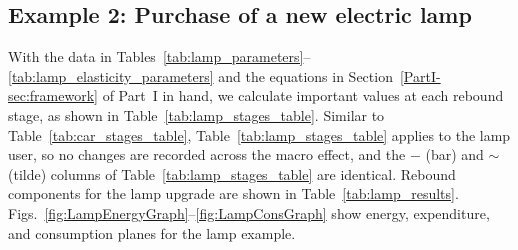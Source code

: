 \documentclass[12pt]{article}\usepackage[]{graphicx}\usepackage[]{xcolor}
\begin{document}
\subsection{Example 2: Purchase of a new electric lamp}
\label{sec:lamp_example}

With the data in
Tables~\ref{tab:lamp_parameters}--\ref{tab:lamp_elasticity_parameters}
and the equations in Section~\ref{PartI-sec:framework} of Part~I in hand,
we calculate important values at each rebound stage,
as shown in Table~\ref{tab:lamp_stages_table}.
Similar to Table~\ref{tab:car_stages_table},
Table~\ref{tab:lamp_stages_table} applies to the lamp user,
so no changes are recorded across the macro effect, and
the $-$ (bar) and $\sim$ (tilde) columns
of Table~\ref{tab:lamp_stages_table} are identical.
Rebound components for the lamp upgrade are shown in Table~\ref{tab:lamp_results}.
Figs.~\ref{fig:LampEnergyGraph}--\ref{fig:LampConsGraph}
show energy, expenditure, and consumption planes
for the lamp example.
\end{document}
